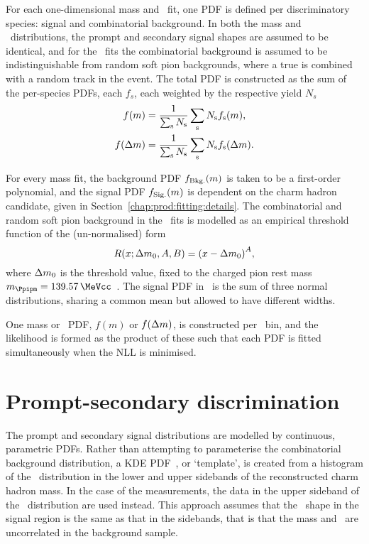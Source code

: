 For each one-dimensional mass and \deltam\ fit, one PDF is defined per 
discriminatory species: signal and combinatorial background.
In both the mass and \deltam\ distributions, the prompt and secondary signal 
shapes are assumed to be identical, and for the \deltam\ fits the combinatorial 
background is assumed to be indistinguishable from random soft pion 
backgrounds, where a true \PDzero is combined with a random track in the event.
The total \ac{PDF} is constructed as the sum of the per-species \acp{PDF}, each $f_{s}$, 
each weighted by the respective yield $N_{s}$
\begin{align}
  f(m) &= \frac{1}{\sum_{\textnormal{s}} N_{\textnormal{s}}}
          \sum_{\textnormal{s}} N_{\textnormal{s}}
          f_{\textnormal{s}}(m),\\
  f(\Delta{m}) &= \frac{1}{\sum_{\textnormal{s}} N_{\textnormal{s}}}
                \sum_{\textnormal{s}} N_{\textnormal{s}}
                f_{\textnormal{s}}(\Delta{m}).
\end{align}

For every mass fit, the background PDF $f_{\textnormal{Bkg.}}(m)$ is taken to 
be a first-order polynomial, and the signal PDF $f_{\textnormal{Sig.}}(m)$ is 
dependent on the charm hadron candidate, given in 
Section~\ref{chap:prod:fitting:details}.
The combinatorial and random soft pion background in the \deltam\ fits is 
modelled as an empirical threshold function of the (un-normalised) form
\begin{equation}
  R(x; \Delta{m}_{0}, A, B) = {(x - \Delta{m}_{0})}^A,
\end{equation}
where $\Delta{m}_{0}$ is the threshold value, fixed to the charged pion rest mass 
$m_{\Ppipm} = \SI{139.57}{\MeVcc}$~\cite{PDG2014}.
The signal PDF in \deltam\ is the sum of three normal distributions, sharing a 
common mean but allowed to have different widths.

One mass or \deltam\ PDF, $f(m)$ or $f(\Delta{m})$, is constructed per \pTy\ bin, 
and the likelihood is formed as the product of these such that each PDF is 
fitted simultaneously when the \ac{NLL} is minimised.

\section{Prompt-secondary discrimination}
\label{chap:prod:fitting:ipchisq}

The prompt and secondary signal distributions are modelled by continuous, 
parametric \acp{PDF}.
Rather than attempting to parameterise the combinatorial background 
distribution, a \acf{KDE} \ac{PDF}~\cite{Poluektov:2014rxa}, or `template', is 
created from a histogram of the \lnipchisq\ distribution in the lower and upper 
sidebands of the reconstructed charm hadron mass.
In the case of the \PDstarp measurements, the data in the upper sideband of the 
\deltam\ distribution are used instead.
This approach assumes that the \lnipchisq\ shape in the signal region is the 
same as that in the sidebands, that is that the mass and \lnipchisq\ are 
uncorrelated in the background sample.

